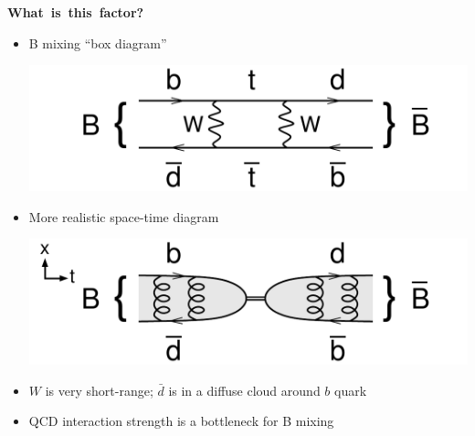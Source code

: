 \documentclass[landscape]{article}
\newenvironment{slide}[1][ ]{\mbox{\bf \boldmath #1 } \vfill}{\vfill \vspace{-1.5 cm} \mbox{ } \pagebreak}
\newenvironment{itemizer}[1]{\begin{itemize}\setlength{\itemsep}{#1}}{\end{itemize}}
\begin{document}
\begin{slide}[What is this factor?]

\begin{itemizer}{1.5 cm}

  \item \begin{minipage}{0.5\linewidth} B mixing ``box diagram'' \end{minipage} \hfill \begin{minipage}{12 cm} \includegraphics[width=\linewidth]{diagram_Bmix_box} \end{minipage}

  \item \begin{minipage}{0.5\linewidth} More realistic space-time diagram \end{minipage} \hfill \begin{minipage}{12 cm} \includegraphics[width=\linewidth]{diagram_Bmix} \end{minipage}

  \item $W$ is very short-range; $\bar{d}$ is in a diffuse cloud around $b$ quark

  \item QCD interaction strength is a bottleneck for B mixing

\end{itemizer}

\end{slide}
\end{document}
